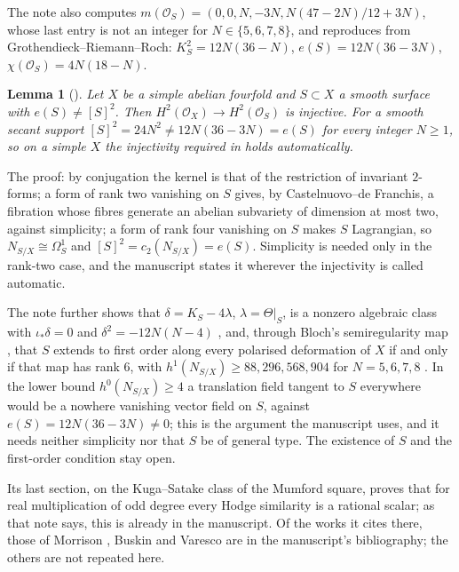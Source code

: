 \documentclass[11pt]{amsart}
\newtheorem{lemma}[theorem]{Lemma}
\theoremstyle{definition}
\theoremstyle{remark}
\newcommand{\cO}{\mathcal{O}}
\begin{document}
The note also computes $m(\cO_{S})=(0,0,N,-3N,N(47-2N)/12+3N)$, whose last
entry is not an integer for $N\in\{5,6,7,8\}$, and reproduces
\cite[Table~3]{BMB} from Grothendieck--Riemann--Roch: $K_{S}^{2}=12N(36-N)$,
$e(S)=12N(36-3N)$, $\chi(\cO_{S})=4N(18-N)$.

\begin{lemma}[{\cite[Lemma~18.43]{BMB}}]\label{lem:inj}
Let $X$ be a simple abelian fourfold and $S\subset X$ a smooth surface with
$e(S)\neq[S]^{2}$. Then $H^{2}(\cO_{X})\to H^{2}(\cO_{S})$ is injective. For a
smooth secant support $[S]^{2}=24N^{2}\neq12N(36-3N)=e(S)$ for every integer
$N\ge1$, so on a simple $X$ the injectivity required in
\cite[Corollary~18.66(ii)]{BMB} holds automatically.
\end{lemma}

The proof: by conjugation the kernel is that of the restriction of invariant
$2$-forms; a form of rank two vanishing on $S$ gives, by Castelnuovo--de
Franchis, a fibration whose fibres generate an abelian subvariety of
dimension at most two, against simplicity; a form of rank four vanishing on
$S$ makes $S$ Lagrangian, so $N_{S/X}\cong\Omega^{1}_{S}$ and
$[S]^{2}=c_{2}(N_{S/X})=e(S)$. Simplicity is needed only in the rank-two
case, and the manuscript states it wherever the injectivity is called
automatic.

The note further shows that $\delta=K_{S}-4\lambda$, $\lambda=\Theta|_{S}$, is
a nonzero algebraic class with $\iota_{*}\delta=0$ and
$\delta^{2}=-12N(N-4)$ \cite[Remark~18.44]{BMB}, and, through Bloch's
semiregularity map \cite{Blo72}, that $S$ extends to first order along every
polarised deformation of $X$ if and only if that map has rank $6$, with
$h^{1}(N_{S/X})\ge88,296,568,904$ for $N=5,6,7,8$
\cite[Proposition~18.46]{BMB}. In the lower bound $h^{0}(N_{S/X})\ge4$ a
translation field tangent to $S$ everywhere would be a nowhere vanishing
vector field on $S$, against $e(S)=12N(36-3N)\ne0$; this is the argument the
manuscript uses, and it needs neither simplicity nor that $S$ be of general
type. The existence of $S$ and the first-order condition stay open.

Its last section, on the Kuga--Satake class of the Mumford square, proves
that for real multiplication of odd degree every Hodge similarity is a
rational scalar; as that note says, this is already in the manuscript. Of the
works it cites there, those of Morrison \cite{Mor84}, Buskin \cite{Bus19} and
Varesco \cite{Var23} are in the manuscript's bibliography; the others are not
repeated here.
\end{document}
